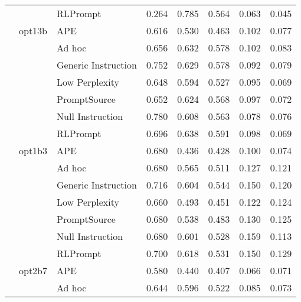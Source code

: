 \begin{supertabular}{lllrrrrr}
              &        & RLPrompt &            0.264 &           0.785 &          0.564 &        0.063 &    0.045 \\
              & opt13b & APE &            0.616 &           0.530 &          0.463 &        0.102 &    0.077 \\
              &        & Ad hoc &            0.656 &           0.632 &          0.578 &        0.102 &    0.083 \\
              &        & Generic Instruction &            0.752 &           0.629 &          0.578 &        0.092 &    0.079 \\
              &        & Low Perplexity &            0.648 &           0.594 &          0.527 &        0.095 &    0.069 \\
              &        & PromptSource &            0.652 &           0.624 &          0.568 &        0.097 &    0.072 \\
              &        & Null Instruction &            0.780 &           0.608 &          0.563 &        0.078 &    0.076 \\
              &        & RLPrompt &            0.696 &           0.638 &          0.591 &        0.098 &    0.069 \\
              & opt1b3 & APE &            0.680 &           0.436 &          0.428 &        0.100 &    0.074 \\
              &        & Ad hoc &            0.680 &           0.565 &          0.511 &        0.127 &    0.121 \\
              &        & Generic Instruction &            0.716 &           0.604 &          0.544 &        0.150 &    0.120 \\
              &        & Low Perplexity &            0.660 &           0.493 &          0.451 &        0.122 &    0.124 \\
              &        & PromptSource &            0.680 &           0.538 &          0.483 &        0.130 &    0.125 \\
              &        & Null Instruction &            0.680 &           0.601 &          0.528 &        0.159 &    0.113 \\
              &        & RLPrompt &            0.700 &           0.618 &          0.531 &        0.150 &    0.129 \\
              & opt2b7 & APE &            0.580 &           0.440 &          0.407 &        0.066 &    0.071 \\
              &        & Ad hoc &            0.644 &           0.596 &          0.522 &        0.085 &    0.073 \\

\end{supertabular}

